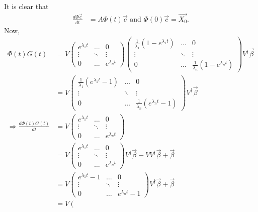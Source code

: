 \documentclass{article}
\begin{document}
\begin{pf}
It is clear that
\begin{align*}
\frac{d\Phi\vec{c}}{dt}&=A\Phi(t)\vec{c} \text{ and } \Phi(0)\vec{c}=\vec{X_0}.
\end{align*}
Now, 
\begin{align*}
\Phi(t)G(t)&=V
\left(\begin{array}{ccccc}
e^{\lambda_1 t}  &\dots &0
\\ \vdots & \ddots &\vdots
\\ 0 & \dots & e^{\lambda_nt}
 \end{array}\right)
 \left(\begin{array}{ccccc}
\frac{1}{\lambda_1}(1-e^{\lambda_1 t})  &\dots &0
\\ \vdots & \ddots &\vdots
\\ 0 & \dots &\frac{1}{\lambda_n} (1-e^{\lambda_nt})
 \end{array}\right)
 V^\dagger\vec{\beta}
 \\&=V
 \left(\begin{array}{ccccc}
\frac{1}{\lambda_1}(e^{\lambda_1 t}-1)  &\dots &0
\\ \vdots & \ddots &\vdots
\\ 0 & \dots &\frac{1}{\lambda_n} (e^{\lambda_nt}-1)
 \end{array}\right)
 V^\dagger\vec{\beta}
 \\ \Rightarrow \frac{d\Phi(t)G(t)}{dt}&=V
 \left(\begin{array}{ccccc}
e^{\lambda_1 t}  &\dots &0
\\ \vdots & \ddots &\vdots
\\ 0 & \dots &e^{\lambda_nt}
 \end{array}\right)
 \\&=V
 \left(\begin{array}{ccccc}
e^{\lambda_1 t}  &\dots &0
\\ \vdots & \ddots &\vdots
\\ 0 & \dots &e^{\lambda_nt}
 \end{array}\right)
 V^\dagger\vec{\beta} -VV^\dagger\vec{\beta}+\vec{\beta}
 \\&=V
 \left(\begin{array}{ccccc}
e^{\lambda_1 t}-1  &\dots &0
\\ \vdots & \ddots &\vdots
\\ 0 & \dots &e^{\lambda_nt}-1
 \end{array}\right)
 V^\dagger\vec{\beta} +\vec{\beta}
  \\&=V
 \left(\begin{array}{ccccc}

\end{array}
\end{align*}
\end{pf}
\end{document}
